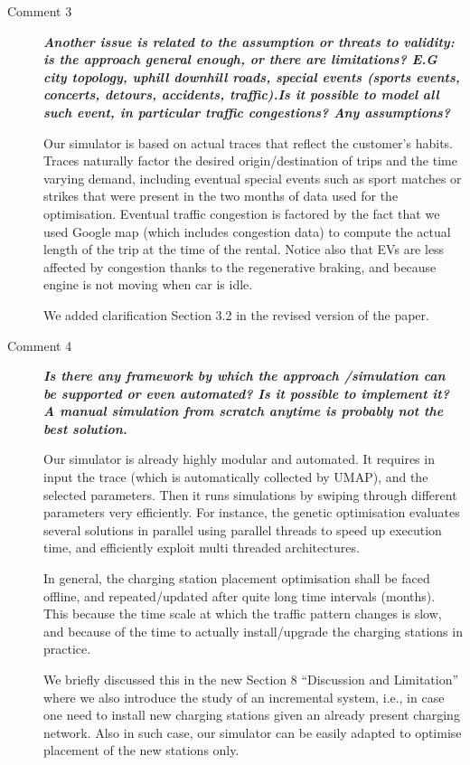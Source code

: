 \documentclass[letterpaper, 10pt]{elsarticle}
\newcommand{\rev}[1]{\textbf{\textit{#1}}}
\begin{document}
\begin{description}
\begin{description}
 \item[Comment 3] \rev{Another issue is related to the assumption or threats to validity: is the approach general enough, or there are limitations? E.G city topology, uphill downhill roads, special events (sports events, concerts, detours, accidents, traffic).Is it possible to model  all such event, in particular traffic congestions? Any assumptions?}

Our simulator is based on actual traces that reflect the customer's habits. 
Traces naturally factor the desired origin/destination of trips and the time varying demand, including eventual special events such as sport matches or strikes that were present in the two months of data used for the optimisation. Eventual traffic congestion is factored by the fact that we used Google map (which includes congestion data) to compute the actual length of the trip at the time of the rental. 
Notice also that EVs are less affected by congestion thanks to the regenerative braking, and because engine is not moving when car is idle.

We added clarification Section 3.2 in the revised version of the paper.

\item[Comment 4] \rev{Is there any framework by which the approach /simulation can be supported or even automated? Is it possible to implement it? A manual simulation from scratch anytime is probably not the best solution.}

Our simulator is already highly modular and automated. It requires in input the trace (which is automatically collected by UMAP), and the selected parameters. Then it runs simulations by swiping through different parameters very efficiently. For instance, the genetic optimisation evaluates several solutions in parallel using parallel threads to speed up execution time, and efficiently exploit multi threaded architectures.

In general, the charging station placement optimisation shall be faced offline, and repeated/updated after quite long time intervals (months). This because the time scale at which the traffic pattern changes is slow, and because of the time to actually install/upgrade the charging stations in practice.

We briefly discussed this in the new Section 8 ``Discussion and Limitation'' where we also introduce the study of an incremental system, i.e., in case one need to install new charging stations given an already present charging network. Also in such case, our simulator can be easily adapted to optimise placement of the new stations only.



\end{description}
\end{description}
\end{document}
